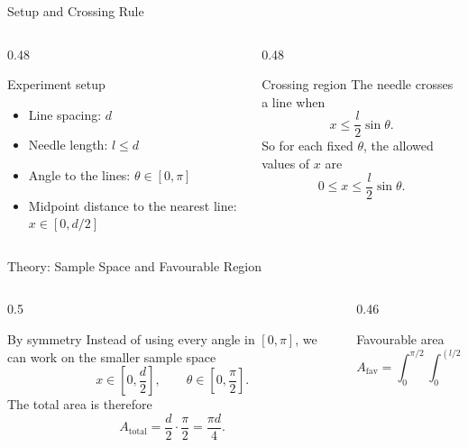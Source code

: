 \documentclass[aspectratio=169]{beamer}
\begin{document}
\begin{frame}{Setup and Crossing Rule}
  \begin{columns}[T]
    \begin{column}{0.48\textwidth}
      \begin{block}{Experiment setup}
        \begin{itemize}
          \item Line spacing: $d$
          \item Needle length: $l \le d$
          \item Angle to the lines: $\theta \in [0,\pi]$
          \item Midpoint distance to the nearest line: $x \in [0,d/2]$
        \end{itemize}
      \end{block}
    \end{column}
    \begin{column}{0.48\textwidth}
      \begin{alertblock}{Crossing region}
        The needle crosses a line when
        \[
          x \le \frac{l}{2}\sin\theta.
        \]
        So for each fixed $\theta$, the allowed values of $x$ are
        \[
          0 \le x \le \frac{l}{2}\sin\theta.
        \]
      \end{alertblock}
    \end{column}
  \end{columns}
\end{frame}

\begin{frame}{Theory: Sample Space and Favourable Region}
  \begin{columns}[T]
    \begin{column}{0.5\textwidth}
      \begin{block}{By symmetry}
        Instead of using every angle in $[0,\pi]$, we can work on the smaller sample space
        \[
          x \in \left[0,\frac{d}{2}\right],
          \qquad
          \theta \in \left[0,\frac{\pi}{2}\right].
        \]
        The total area is therefore
        \[
          A_{\text{total}} = \frac{d}{2}\cdot\frac{\pi}{2} = \frac{\pi d}{4}.
        \]
      \end{block}
    \end{column}
    \begin{column}{0.46\textwidth}
      \begin{exampleblock}{Favourable area}
        \[
          A_{\text{fav}}
          =
          \int_0^{\pi/2}\int_0^{(l/2)\sin\theta} dx\,d\theta.
        \]
      \end{exampleblock}
    \end{column}
  \end{columns}
\end{frame}
\end{document}
